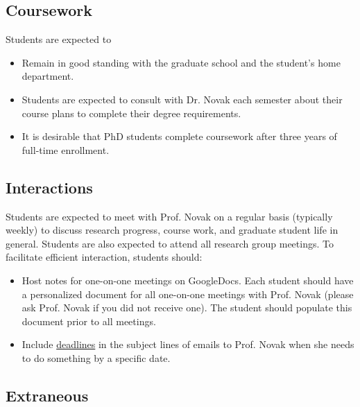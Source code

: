 \documentclass[12pt,twoside]{article}
\begin{document}
\subsection*{Coursework}

Students are expected to 
%
\begin{itemize}
\item Remain in good standing with the graduate school and the student's home department.
\item Students are expected to consult with Dr. Novak each semester about their course plans to complete their degree requirements.
\item It is desirable that PhD students complete coursework after three years of full-time enrollment. 
\end{itemize}

\subsection*{Interactions}

Students are expected to meet with Prof. Novak on a regular basis (typically weekly) to discuss research progress, course work, and graduate student life in general. Students are also expected to attend all research group meetings. To facilitate efficient interaction, students should: 
%
\begin{itemize}
\item Host notes for one-on-one meetings on GoogleDocs. Each student should have a personalized document for all one-on-one meetings with Prof. Novak (please ask Prof. Novak if you did not receive one). The student should populate this document prior to all meetings.
\item Include \underline{deadlines} in the subject lines of emails to Prof. Novak when she needs to do something by a specific date.
\end{itemize}

\subsection*{Extraneous}
\end{document}
